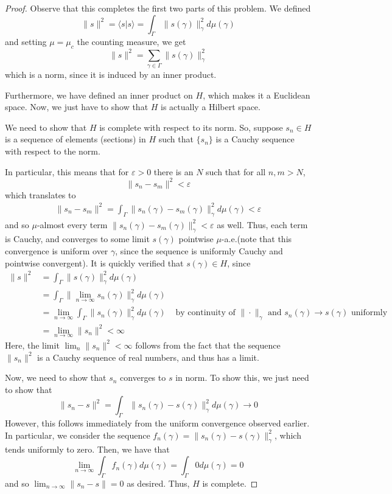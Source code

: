\documentclass[fontsize=11pt]{scrartcl} %
\numberwithin{equation}{section} %
\numberwithin{figure}{section} %
\numberwithin{table}{section} %
\newcommand{\la}{\langle}
\newcommand{\ra}{\rangle}
\begin{document}
\begin{proof}
    Observe that this completes the first two parts of this problem. We defined
    \[
        \|s\|^2 = \la s|s\ra = \int_{\Gamma}\|s(\gamma)\|_{\gamma}^2
        d\mu(\gamma)
    \]
    and setting $\mu = \mu_c$ the counting measure, we get
    \[
        \|s\|^2 = \sum_{\gamma\in\Gamma}\|s(\gamma)\|_{\gamma}^2
    \]
    which is a norm, since it is induced by an inner product.

    Furthermore, we have defined an inner product on $H$, which makes it a
    Euclidean space. Now, we just have to show that $H$ is actually a Hilbert
    space.


    We need to show that $H$ is complete with respect to its norm. So, suppose
    $s_n\in H$ is a sequence of elements (sections) in $H$ such that $\{s_n\}$
    is a Cauchy sequence with respect to the norm.

    In particular, this means that for $\varepsilon>0$ there is an $N$ such that
    for all $n,m>N$,
    \[
        \|s_n-s_m\|^2 < \varepsilon
    \]
    which translates to
    \[
        \begin{aligned}
            \|s_n-s_m\|^2 = \int_{\Gamma}\|s_n(\gamma) - s_m(\gamma)\|_{\gamma}^2
            d\mu(\gamma) <
            \varepsilon
    \end{aligned}
    \]
    and so $\mu$-almost every term $\|s_n(\gamma)-s_m(\gamma)\|_{\gamma}^2 <
    \varepsilon$ as well. Thus, each term
    is Cauchy, and converges to some limit $s(\gamma)$ pointwise $\mu$-a.e.(note
    that this convergence is uniform over $\gamma$, since the sequence is
uniformly Cauchy and pointwise convergent). It is quickly verified that
    $s(\gamma)\in H$, since
    \[
        \begin{aligned}
        \|s\|^2 &= \int_{\Gamma}\|s(\gamma)\|_{\gamma}^2d\mu(\gamma)\\
        &=
        \int_{\Gamma}\|\lim_{n\to\infty}s_n(\gamma)\|_{\gamma}^2d\mu(\gamma)\\
        &= \lim_{n\to\infty}\int_{\Gamma}\|s_n(\gamma)\|_{\gamma}^2
        d\mu(\gamma) &\text{ by continuity of $\|\cdot\|_{\gamma}$ and
        $s_n(\gamma)\to s(\gamma)$ uniformly}\\
        &= \lim_{n\to\infty}\|s_n\|^2 < \infty
        \end{aligned}
    \]
    Here, the limit $\lim_n\|s_n\|^2 <\infty$ follows from the fact that the
    sequence $\|s_n\|^2$ is a Cauchy sequence of real numbers, and thus has a
    limit.

    Now, we need to show that $s_n$ converges to $s$ in norm.
    To show this, we just need to show that
    \[
        \|s_n-s\|^2 = \int_{\Gamma}\|s_n(\gamma)- s(\gamma)\|^2_{\gamma}d\mu(\gamma)
        \to 0
    \]
    However, this follows immediately from the uniform convergence observed
    earlier. In particular, we consider the sequence $f_n(\gamma) =
    \|s_n(\gamma) - s(\gamma)\|^2_{\gamma}$, which tends uniformly to zero.
    Then, we have that
    \[
        \lim_{n\to\infty}\int_{\Gamma}f_n(\gamma)d\mu(\gamma) =
        \int_{\Gamma}0d\mu(\gamma) = 0
    \]
    and so $\lim_{n\to\infty}\|s_n-s\| = 0$ as desired. Thus, $H$ is complete.



\end{proof}
\end{document}
